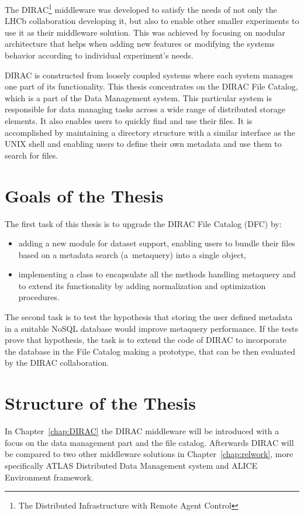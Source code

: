 The DIRAC\footnote{The Distributed Infrastructure with Remote Agent Control} middleware was developed to satisfy
the needs of not only the LHCb collaboration developing it, but also to enable other smaller experiments to use
it as their middleware solution. This was achieved by focusing on modular architecture that helps when
adding new features or modifying the systems behavior according to individual experiment's needs. 

DIRAC is constructed from loosely coupled systems where each system manages one part of its functionality. This 
thesis concentrates on the DIRAC File Catalog, which is a part of the Data Management system. This particular 
system is responsible for data managing tasks across a wide range of distributed storage elements. It also enables 
users to quickly find and use their files. It is accomplished by maintaining a 
directory structure with a similar interface as the UNIX shell and enabling users to define their own metadata
and use them to search for files.

\section*{Goals of the Thesis}

The first task of this thesis is to upgrade the DIRAC File Catalog (DFC) by:
\begin{itemize}
\item adding a new module for dataset support, enabling users to bundle their files based on a metadata search 
(a~metaquery) into a single object,
\item implementing a class to encapsulate all the methods handling metaquery and to extend its 
functionality by adding normalization and optimization procedures.
\end{itemize}

The second task is to test the hypothesis that storing the user defined metadata in a suitable NoSQL database 
would improve metaquery performance. If the tests prove that hypothesis, the task is to extend the code of DIRAC 
to incorporate the database in the File Catalog making a prototype, that can be then evaluated by the DIRAC 
collaboration.

\section*{Structure of the Thesis}

In Chapter~\ref{chap:DIRAC} the DIRAC middleware will be introduced with a focus on the data management part and the 
file catalog. Afterwards DIRAC will be compared to two other middleware solutions in Chapter~\ref{chap:relwork}, 
more specifically ATLAS Distributed Data Management system and ALICE Environment framework.

